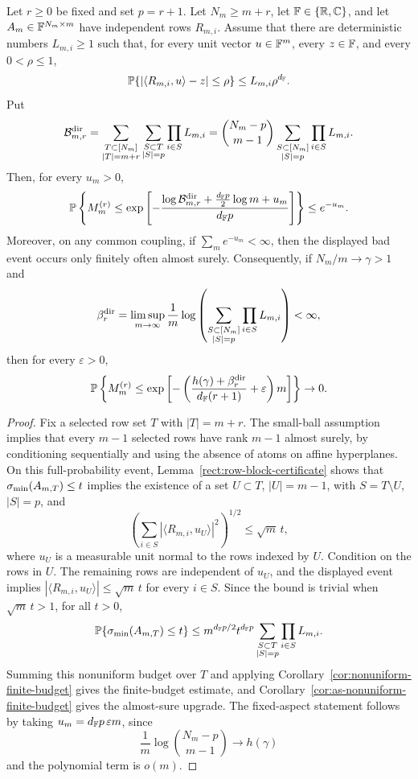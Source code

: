 \begin{corollary}\label{rect:directional-row-fixed-excess}
Let \(r\ge0\) be fixed and set \(p=r+1\).  Let \(N_m\ge m+r\), let
\(\mathbb{F}\in\{\mathbb{R},\mathbb{C}\}\), and let \(A_m\in\mathbb{F}^{N_m\times m}\) have independent rows
\(R_{m,i}\).  Assume that there are deterministic numbers \(L_{m,i}\ge1\) such
that, for every unit vector \(u\in\mathbb{F}^m\), every \(z\in\mathbb{F}\), and every
\(0<\rho\le1\),
\[
  \mathbb{P}\{|\langle R_{m,i},u\rangle-z|\le\rho\}\le L_{m,i}\rho^{d_{\mathbb{F}}}.
\]
Put
\[
  \mathcal B_{m,r}^{\rm dir}
  =
  \sum_{\substack{T\subset[N_m]\\ |T|=m+r}}
  \sum_{\substack{S\subset T\\ |S|=p}}\prod_{i\in S}L_{m,i}
  =
  \binom{N_m-p}{m-1}
  \sum_{\substack{S\subset[N_m]\\ |S|=p}}\prod_{i\in S}L_{m,i}.
\]
Then, for every \(u_m>0\),
\[
  \mathbb{P}\left\{
  M_m^{(r)}\le
  \exp\left[-\frac{\log \mathcal B_{m,r}^{\rm dir}
    +\frac{d_{\mathbb{F}} p}{2}\log m+u_m}{d_{\mathbb{F}} p}\right]\right\}
  \le e^{-u_m}.
\]
Moreover, on any common coupling, if \(\sum_m e^{-u_m}<\infty\), then the
displayed bad event occurs only finitely often almost surely.
Consequently, if \(N_m/m\to\gamma>1\) and
\[
  \beta_r^{\rm dir}
  =
  \limsup_{m\to\infty}\frac1m
  \log\left(\sum_{\substack{S\subset[N_m]\\ |S|=p}}
       \prod_{i\in S}L_{m,i}\right)<\infty ,
\]
then for every \(\varepsilon>0\),
\[
  \mathbb{P}\left\{
  M_m^{(r)}
  \le \exp\left[-\left(
  \frac{h(\gamma)+\beta_r^{\rm dir}}{d_{\mathbb{F}}(r+1)}
  +\varepsilon\right)m\right]\right\}\to0 .
\]
\end{corollary}

\begin{proof}
Fix a selected row set \(T\) with \(|T|=m+r\).  The small-ball assumption
implies that every \(m-1\) selected rows have rank \(m-1\) almost surely, by
conditioning sequentially and using the absence of atoms on affine hyperplanes.
On this full-probability event, Lemma~\ref{rect:row-block-certificate} shows
that \(\sigma_{\min}(A_{m,T})\le t\) implies the existence of a set
\(U\subset T\), \(|U|=m-1\), with \(S=T\setminus U\), \(|S|=p\), and
\[
  \left(\sum_{i\in S}|\langle R_{m,i},u_U\rangle|^2\right)^{1/2}
  \le \sqrt m\,t ,
\]
where \(u_U\) is a measurable unit normal to the rows indexed by \(U\).
Condition on the rows in \(U\).  The remaining rows are independent of
\(u_U\), and the displayed event implies
\(|\langle R_{m,i},u_U\rangle|\le\sqrt m\,t\) for every \(i\in S\).  Since
the bound is trivial when \(\sqrt m\,t>1\), for all \(t>0\),
\[
  \mathbb{P}\{\sigma_{\min}(A_{m,T})\le t\}
  \le m^{d_{\mathbb{F}} p/2}t^{d_{\mathbb{F}} p}
  \sum_{\substack{S\subset T\\ |S|=p}}\prod_{i\in S}L_{m,i}.
\]
Summing this nonuniform budget over \(T\) and applying
Corollary~\ref{cor:nonuniform-finite-budget} gives the finite-budget estimate,
and Corollary~\ref{cor:as-nonuniform-finite-budget} gives the almost-sure
upgrade.  The fixed-aspect statement follows by taking
\(u_m=d_{\mathbb{F}} p\,\varepsilon m\), since
\[
  \frac1m\log\binom{N_m-p}{m-1}\to h(\gamma)
\]
and the polynomial term is \(o(m)\).
\end{proof}

